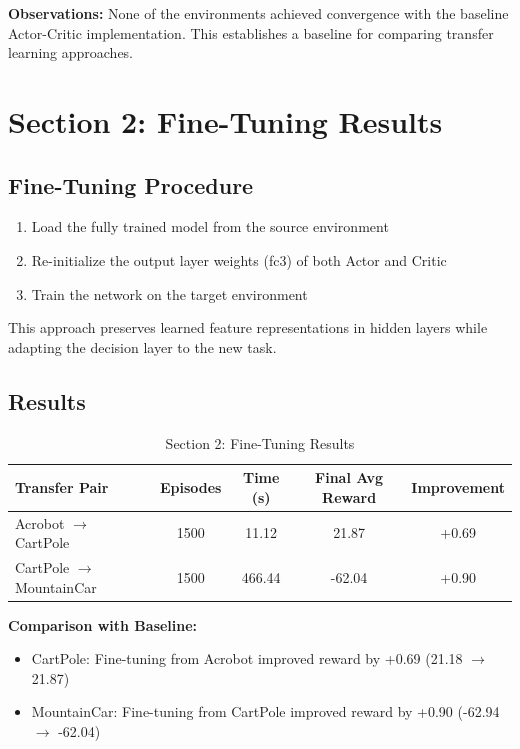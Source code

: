 \documentclass[11pt,a4paper]{article}
\begin{document}
\textbf{Observations:} None of the environments achieved convergence with the baseline Actor-Critic implementation. This establishes a baseline for comparing transfer learning approaches.

\section{Section 2: Fine-Tuning Results}

\subsection{Fine-Tuning Procedure}
\begin{enumerate}
    \item Load the fully trained model from the source environment
    \item Re-initialize the output layer weights (fc3) of both Actor and Critic
    \item Train the network on the target environment
\end{enumerate}

This approach preserves learned feature representations in hidden layers while adapting the decision layer to the new task.

\subsection{Results}

\begin{table}[H]
\centering
\caption{Section 2: Fine-Tuning Results}
\begin{tabular}{lcccc}
\toprule
\textbf{Transfer Pair} & \textbf{Episodes} & \textbf{Time (s)} & \textbf{Final Avg Reward} & \textbf{Improvement} \\
\midrule
Acrobot $\rightarrow$ CartPole & 1500 & 11.12 & 21.87 & +0.69 \\
CartPole $\rightarrow$ MountainCar & 1500 & 466.44 & -62.04 & +0.90 \\
\bottomrule
\end{tabular}
\end{table}

\textbf{Comparison with Baseline:}
\begin{itemize}
    \item CartPole: Fine-tuning from Acrobot improved reward by +0.69 (21.18 $\rightarrow$ 21.87)
    \item MountainCar: Fine-tuning from CartPole improved reward by +0.90 (-62.94 $\rightarrow$ -62.04)
\end{itemize}
\end{document}
